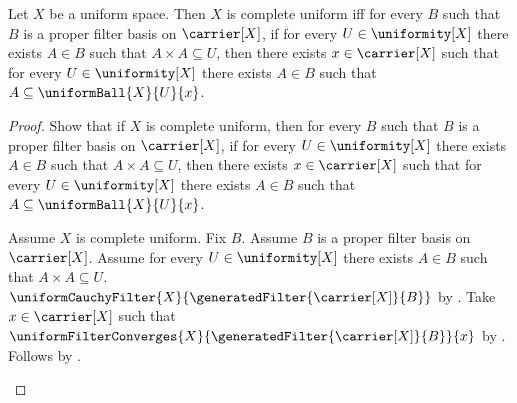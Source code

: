 \begin{theorem}\label{complete_uniform_iff_filter_basis_convergence}
    Let $X$ be a uniform space.
    Then $X$ is complete uniform iff for every $B$ such that
        $B$ is a proper filter basis on $\carrier[X]$, if
        for every $U\in\uniformity[X]$ there exists $A\in B$ such that
            $A\times A\subseteq U$, then there exists $x\in\carrier[X]$
        such that for every $U\in\uniformity[X]$ there exists $A\in B$
        such that $A\subseteq\uniformBall{X}{U}{x}$.
\end{theorem}
\begin{proof}
    Show that if $X$ is complete uniform, then for every $B$ such that
        $B$ is a proper filter basis on $\carrier[X]$, if
        for every $U\in\uniformity[X]$ there exists $A\in B$ such that
            $A\times A\subseteq U$, then there exists $x\in\carrier[X]$
        such that for every $U\in\uniformity[X]$ there exists $A\in B$
        such that $A\subseteq\uniformBall{X}{U}{x}$.
    \begin{subproof}
        Assume $X$ is complete uniform.
        Fix $B$.
        Assume $B$ is a proper filter basis on $\carrier[X]$.
        Assume for every $U\in\uniformity[X]$ there exists $A\in B$
            such that $A\times A\subseteq U$.
        $\uniformCauchyFilter{X}
            {\generatedFilter{\carrier[X]}{B}}$
            by .
        Take $x\in\carrier[X]$ such that
            $\uniformFilterConverges{X}
                {\generatedFilter{\carrier[X]}{B}}{x}$
            by .
        Follows by .
    \end{subproof}


\end{proof}
